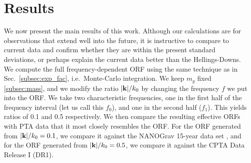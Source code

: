 \documentclass[prd,aps,psfig,nofootinbib,nobibnotes,superscriptaddress,preprintnumbers,times]{revtex4-2}\setlength{\topmargin}{-14mm}
\begin{document}
\section{Results}\label{sec:results}
We now present the main results of this work. Although our calculations are for observations that extend well into the future, it is instructive to compare to current data and confirm whether they are within the present standard deviations, or perhaps explain the current data better than the Hellings-Downs. We compute the full frequency-dependent ORF using the same technique as in Sec.\ \ref{subsec:exp_fac}, i.e.\ Monte-Carlo integration. We keep $m_g$ fixed \ref{subsec:mass}, and we modify the ratio $|{\bf k}|/k_0$ by changing the frequency $f$ we put into the ORF. We take two characteristic frequencies, one in the first half of the frequency interval (let us call this $f_0$), and one in the second half ($f_1$). This yields ratios of 0.1 and 0.5 respectively. We then compare the resulting effective ORFs with PTA data that it most closely resembles the ORF. For the ORF generated from $|{\bf k}|/k_0 = 0.1$, we compare it against the NANOGrav 15-year data set \cite{Agazie:2023}, and for the ORF generated from $|{\bf k}|/k_0 = 0.5$, we compare it against the CPTA Data Release I (DR1).
\end{document}
